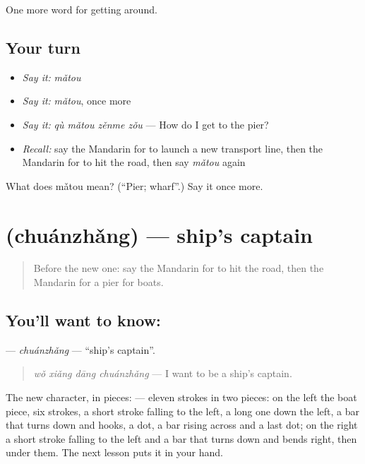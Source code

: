 \begin{grammarlens}[title={What you've built}]
One more word for getting around.
\end{grammarlens}

\subsection*{Your turn}
\begin{itemize}
\raggedright
  \item \emph{Say it:} \emph{mǎtou}
  \item \emph{Say it:} \emph{mǎtou}, once more
  \item \emph{Say it:} \emph{qù mǎtou zěnme zǒu} — How do I get to the pier?
  \item \emph{Recall:} say the Mandarin for to launch a new transport line, then the Mandarin for to hit the road, then say \emph{mǎtou} again
\end{itemize}

\begin{tcolorbox}[breakable,colback=teal!4,colframe=teal!35!black,title={Before you move on}]
What does mǎtou mean? (\textquotedblleft{}Pier; wharf\textquotedblright{}.) Say it once more.
\end{tcolorbox}
\section[\texorpdfstring{\zh{船长} (chuánzhǎng)}{船长 (chuánzhǎng)}]{ (chuánzhǎng) — ship's captain}

\label{lesson:ZH-C411-chuanzhang}



\begin{quote}
Before the new one: say the Mandarin for to hit the road, then the Mandarin for a pier for boats.
\end{quote}

\subsection*{You'll want to know: }
\textbf{} — \emph{chuánzhǎng} — \textquotedblleft{}ship's captain\textquotedblright{}.

\begin{quote}
\textbf{} \emph{wǒ xiǎng dāng chuánzhǎng} — I want to be a ship's captain.
\end{quote}

The new character, in pieces:  — eleven strokes in two pieces: on the left the boat piece, six strokes, a short stroke falling to the left, a long one down the left, a bar that turns down and hooks, a dot, a bar rising across and a last dot; on the right a short stroke falling to the left and a bar that turns down and bends right, then  under them. The next lesson puts it in your hand.

